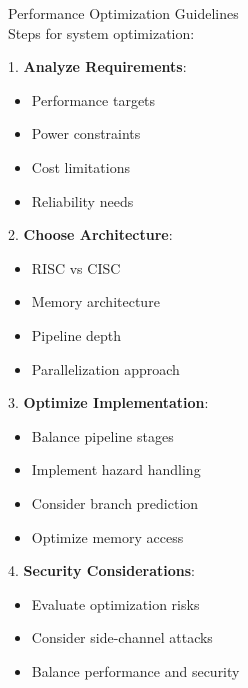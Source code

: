\begin{KR}{Performance Optimization Guidelines}\\
Steps for system optimization:

1. \textbf{Analyze Requirements}:
\begin{itemize}
  \item Performance targets
  \item Power constraints
  \item Cost limitations
  \item Reliability needs
\end{itemize}

2. \textbf{Choose Architecture}:
\begin{itemize}
  \item RISC vs CISC
  \item Memory architecture
  \item Pipeline depth
  \item Parallelization approach
\end{itemize}

3. \textbf{Optimize Implementation}:
\begin{itemize}
  \item Balance pipeline stages
  \item Implement hazard handling
  \item Consider branch prediction
  \item Optimize memory access
\end{itemize}

4. \textbf{Security Considerations}:
\begin{itemize}
  \item Evaluate optimization risks
  \item Consider side-channel attacks
  \item Balance performance and security
\end{itemize}
\end{KR}



